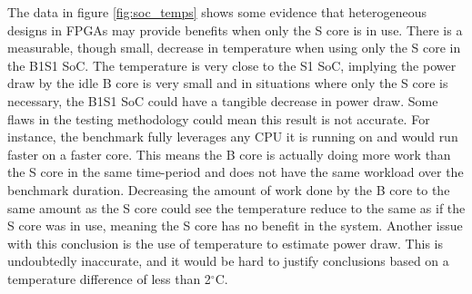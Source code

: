 The data in figure \ref{fig:soc_temps} shows some evidence that heterogeneous designs in FPGAs may provide benefits when only the S core is in use. There is a measurable, though small, decrease in temperature when using only the S core in the B1S1 SoC. The temperature is very close to the S1 SoC, implying the power draw by the idle B core is very small and in situations where only the S core is necessary, the B1S1 SoC could have a tangible decrease in power draw. Some flaws in the testing methodology could mean this result is not accurate. For instance, the benchmark fully leverages any CPU it is running on and would run faster on a faster core. This means the B core is actually doing more work than the S core in the same time-period and does not have the same workload over the benchmark duration. Decreasing the amount of work done by the B core to the same amount as the S core could see the temperature reduce to the same as if the S core was in use, meaning the S core has no benefit in the system. Another issue with this conclusion is the use of temperature to estimate power draw. This is undoubtedly inaccurate, and it would be hard to justify conclusions based on a temperature difference of less than 2$^{\circ}$C.
